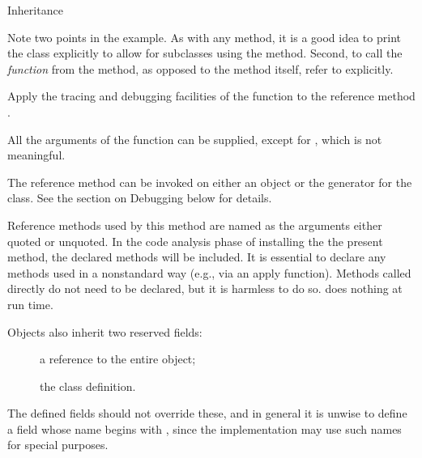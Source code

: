 \begin{Section}{Inheritance}
\begin{description}
Note two points in the example.  As with any  method, it
is a good idea to print the class explicitly to allow for subclasses
using the method.  Second, to call the \emph{function} 
from the method, as opposed to the  
method itself, refer to  explicitly.


\item[\code{\$trace(what, ...)}, \code{\$untrace(what)} ] 
Apply the tracing and debugging facilities of the 
function to the reference method .

All the arguments of the 
function can be supplied, except for , which is not
meaningful.

The reference method can be invoked on either an object or the
generator for the class.  See the section on Debugging below for details.


\item[\code{\$usingMethods(...)}]  
Reference methods used by this method are named as the arguments
either quoted or unquoted.  In the code analysis phase of installing the
the present method, the declared methods will be included.  It is essential
to declare any methods used in a nonstandard way (e.g., via an apply function).
Methods called directly do not need to be declared, but it is harmless to do so.
 does nothing at run time. 


\end{description}
 

Objects also inherit two reserved fields:
\begin{description}

\item[] 
a reference to the entire object;

\item[] 
the class definition.


\end{description}
 
The defined fields should not override these, and in general it is
unwise to define a field whose name begins with , since the
implementation may use such names for special purposes.

\end{Section}
%
